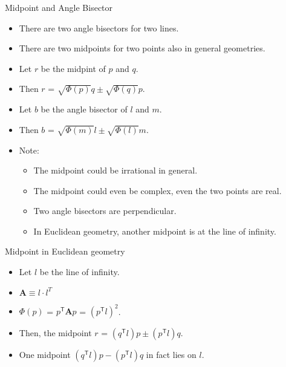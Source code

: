 \documentclass[10pt,ignorenonframetext,serif,onlymath]{beamer}
\providecommand{\tightlist}{%
  \setlength{\itemsep}{0pt}\setlength{\parskip}{0pt}}
\begin{document}
\begin{frame}{Midpoint and Angle Bisector}
\protect\hypertarget{sec:midpoint-and-angle-bisector}{}

\begin{itemize}
\tightlist
\item
  There are two angle bisectors for two lines.
\item
  There are two midpoints for two points also in general geometries.
\item
  Let \(r\) be the midpint of \(p\) and \(q\).
\item
  Then \(r\) = \(\sqrt{\Phi(p)} q \pm \sqrt{\Phi(q)} p\).
\item
  Let \(b\) be the angle bisector of \(l\) and \(m\).
\item
  Then \(b\) = \(\sqrt{\Phi(m)} l \pm \sqrt{\Phi(l)} m\).
\item
  Note:

  \begin{itemize}
  \tightlist
  \item
    The midpoint could be irrational in general.
  \item
    The midpoint could even be complex, even the two points are real.
  \item
    Two angle bisectors are perpendicular.
  \item
    In Euclidean geometry, another midpoint is at the line of infinity.
  \end{itemize}
\end{itemize}

\end{frame}

\begin{frame}{Midpoint in Euclidean geometry}
\protect\hypertarget{sec:midpoint-in-euclidean-geometry}{}
 
\begin{itemize}
\tightlist
\item
  Let \(l\) be the line of infinity.
\item
  \(\mathbf{A} \equiv l \cdot l^{T}\)
\item
  \(\Phi(p)\) = \(p^\mathsf{T} \mathbf{A} p\) = \((p^\mathsf{T} l)^2\).
\item
  Then, the midpoint \(r\) =
  \((q^\mathsf{T} l) p \pm (p^\mathsf{T} l) q\).
\item
  One midpoint \((q^\mathsf{T} l) p - (p^\mathsf{T} l) q\) in fact lies
  on \(l\).
\end{itemize}

\end{frame}
\end{document}
